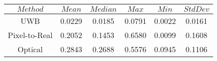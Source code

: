 \begin{table}[h]
\centering
\begin{tabular}{|c|c|c|c|c|c|}
\hline
$Method$ & $Mean$ & $Median$ & $Max$ & $Min$ & $StdDev$ \\
\hline
UWB & 0.0229 & 0.0185 & 0.0791 & 0.0022 & 0.0161 \\
\hline
Pixel-to-Real & 0.2052 & 0.1453 & 0.6580 & 0.0099 & 0.1608 \\
\hline
Optical & 0.2843 & 0.2688 & 0.5576 & 0.0945 & 0.1106 \\
\hline
\end{tabular}
\end{table}
